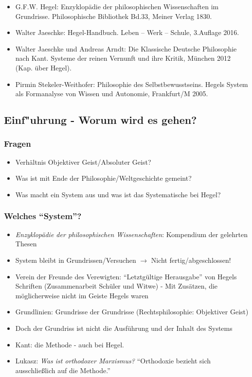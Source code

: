 \documentclass[emulatestandardclasses]{scrartcl}
\begin{document}
\begin{itemize}
  \item G.F.W. Hegel: Enzyklopädie der philosophischen Wissenschaften im Grundrisse. Philosophische Bibliothek Bd.33, Meiner Verlag 1830.
  \item Walter Jaeschke: Hegel-Handbuch. Leben – Werk – Schule, 3.Auflage 2016.     
  \item Walter Jaeschke und Andreas Arndt: Die Klassische Deutsche Philosophie nach Kant. Systeme der reinen Vernunft und ihre Kritik, München 2012 (Kap. über Hegel).     
  \item Pirmin Stekeler-Weithofer: Philosophie des Selbstbewusstseins. Hegels System als Formanalyse von Wissen und Autonomie, Frankfurt/M 2005.
\end{itemize}


\subsection{Einf"uhrung - Worum wird es gehen?}

\subsubsection{Fragen}

\begin{itemize}
  \item Verhältnis Objektiver Geist/Absoluter Geist?
  \item Was ist mit Ende der Philosophie/Weltgeschichte gemeint?
  \item Was macht ein System aus und was ist das Systematische bei Hegel?
\end{itemize}

\subsubsection{Welches "`System"'?}

\begin{itemize}
  \item \emph{Enzyklopädie der philosophischen Wissenschaften}: Kompendium der gelehrten Thesen
  \item System bleibt in Grundrissen/Versuchen $\rightarrow$ Nicht fertig/abgeschlossen!
  \item Verein der Freunde des Verewigten: "`Letztgültige Herausgabe"' von Hegels Schriften (Zusammenarbeit Schüler und Witwe) - Mit Zusätzen, die möglicherweise nicht im Geiste Hegels waren
  \item Grundlinien: Grundrisse der Grundrisse (Rechtsphilosophie: Objektiver Geist)
  \item Doch der Grundriss ist nicht die Ausführung und der Inhalt des Systems
  \item Kant: die Methode - auch bei Hegel.
  \item Lukasz: \emph{Was ist orthodoxer Marxismus?} "`Orthodoxie bezieht sich ausschließlich auf die Methode."'
\end{itemize}
\end{document}
